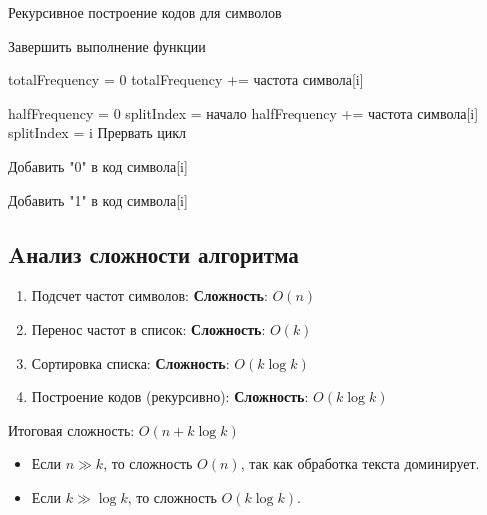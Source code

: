 \documentclass[12pt]{article}
\begin{document}
\begin{algorithm}[H]
\caption{Рекурсивное построение кодов для символов}
\begin{algorithmic}[1]
        \State Завершить выполнение функции
    \EndIf

    \State totalFrequency = 0
        \State totalFrequency += частота символа[i]
    \EndFor

    \State halfFrequency = 0
    \State splitIndex = начало
        \State halfFrequency += частота символа[i]
            \State splitIndex = i
            \State Прервать цикл
        \EndIf
    \EndFor

        \State Добавить "0" в код символа[i]
    \EndFor

        \State Добавить "1" в код символа[i]
    \EndFor

    \State {}
    \State {}
\EndFunction
\end{algorithmic}
\end{algorithm}

\newpage
\subsection{\textbf{Aнализ сложности алгоритма}}

\begin{enumerate}
    \item Подсчет частот символов: \textbf{Сложность}: $O(n)$
    \item Перенос частот в список: \textbf{Сложность}: $O(k)$
    \item Сортировка списка: \textbf{Сложность}: $O(k \log k)$
    \item Построение кодов (рекурсивно): \textbf{Сложность}: $O(k \log k)$
\end{enumerate}

Итоговая сложность: $O(n + k \log k)$

\begin{itemize}
    \item Если $n \gg k$, то сложность $O(n)$, так как обработка текста доминирует.
    \item Если $k \gg \log k$, то сложность $O(k \log k)$.
\end{itemize}
\end{document}

